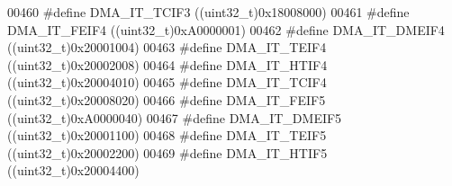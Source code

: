 \begin{DoxyCode}
00460 \textcolor{preprocessor}{#}\textcolor{preprocessor}{define} \textcolor{preprocessor}{DMA\_IT\_TCIF3}                      \textcolor{preprocessor}{(}\textcolor{preprocessor}{(}\textcolor{preprocessor}{uint32\_t}\textcolor{preprocessor}{)}0x18008000\textcolor{preprocessor}{)}
00461 \textcolor{preprocessor}{#}\textcolor{preprocessor}{define} \textcolor{preprocessor}{DMA\_IT\_FEIF4}                      \textcolor{preprocessor}{(}\textcolor{preprocessor}{(}\textcolor{preprocessor}{uint32\_t}\textcolor{preprocessor}{)}0xA0000001\textcolor{preprocessor}{)}
00462 \textcolor{preprocessor}{#}\textcolor{preprocessor}{define} \textcolor{preprocessor}{DMA\_IT\_DMEIF4}                     \textcolor{preprocessor}{(}\textcolor{preprocessor}{(}\textcolor{preprocessor}{uint32\_t}\textcolor{preprocessor}{)}0x20001004\textcolor{preprocessor}{)}
00463 \textcolor{preprocessor}{#}\textcolor{preprocessor}{define} \textcolor{preprocessor}{DMA\_IT\_TEIF4}                      \textcolor{preprocessor}{(}\textcolor{preprocessor}{(}\textcolor{preprocessor}{uint32\_t}\textcolor{preprocessor}{)}0x20002008\textcolor{preprocessor}{)}
00464 \textcolor{preprocessor}{#}\textcolor{preprocessor}{define} \textcolor{preprocessor}{DMA\_IT\_HTIF4}                      \textcolor{preprocessor}{(}\textcolor{preprocessor}{(}\textcolor{preprocessor}{uint32\_t}\textcolor{preprocessor}{)}0x20004010\textcolor{preprocessor}{)}
00465 \textcolor{preprocessor}{#}\textcolor{preprocessor}{define} \textcolor{preprocessor}{DMA\_IT\_TCIF4}                      \textcolor{preprocessor}{(}\textcolor{preprocessor}{(}\textcolor{preprocessor}{uint32\_t}\textcolor{preprocessor}{)}0x20008020\textcolor{preprocessor}{)}
00466 \textcolor{preprocessor}{#}\textcolor{preprocessor}{define} \textcolor{preprocessor}{DMA\_IT\_FEIF5}                      \textcolor{preprocessor}{(}\textcolor{preprocessor}{(}\textcolor{preprocessor}{uint32\_t}\textcolor{preprocessor}{)}0xA0000040\textcolor{preprocessor}{)}
00467 \textcolor{preprocessor}{#}\textcolor{preprocessor}{define} \textcolor{preprocessor}{DMA\_IT\_DMEIF5}                     \textcolor{preprocessor}{(}\textcolor{preprocessor}{(}\textcolor{preprocessor}{uint32\_t}\textcolor{preprocessor}{)}0x20001100\textcolor{preprocessor}{)}
00468 \textcolor{preprocessor}{#}\textcolor{preprocessor}{define} \textcolor{preprocessor}{DMA\_IT\_TEIF5}                      \textcolor{preprocessor}{(}\textcolor{preprocessor}{(}\textcolor{preprocessor}{uint32\_t}\textcolor{preprocessor}{)}0x20002200\textcolor{preprocessor}{)}
00469 \textcolor{preprocessor}{#}\textcolor{preprocessor}{define} \textcolor{preprocessor}{DMA\_IT\_HTIF5}                      \textcolor{preprocessor}{(}\textcolor{preprocessor}{(}\textcolor{preprocessor}{uint32\_t}\textcolor{preprocessor}{)}0x20004400\textcolor{preprocessor}{)}

\end{DoxyCode}
